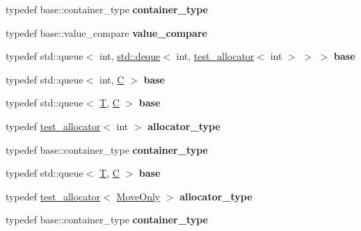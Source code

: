 \begin{DoxyCompactItemize}
\mbox{\label{structtest_a73247bd60092d6e305cfa4fe71ba65a8}} 
typedef base\+::container\+\_\+type {\bfseries container\+\_\+type}
\item 
\mbox{\label{structtest_adfa36bc6fd0cc112b780555f966052fc}} 
typedef base\+::value\+\_\+compare {\bfseries value\+\_\+compare}
\item 
\mbox{\label{structtest_ae8420c4368e1329304cace4f2f84300d}} 
typedef std\+::queue$<$ int, \mbox{\hyperlink{classstd_1_1deque}{std\+::deque}}$<$ int, \mbox{\hyperlink{classtest__allocator}{test\+\_\+allocator}}$<$ int $>$ $>$ $>$ {\bfseries base}
\item 
\mbox{\label{structtest_a2b9f414a2d11bc75fa648d1557500d0f}} 
typedef std\+::queue$<$ int, \mbox{\hyperlink{struct_c}{C}} $>$ {\bfseries base}
\item 
\mbox{\label{structtest_a9487e8c7d7e14c14936c3d5278f51354}} 
typedef std\+::queue$<$ \mbox{\hyperlink{struct_t}{T}}, \mbox{\hyperlink{struct_c}{C}} $>$ {\bfseries base}
\item 
\mbox{\label{structtest_ac503282f2bb91da46e782df80b9cef81}} 
typedef \mbox{\hyperlink{classtest__allocator}{test\+\_\+allocator}}$<$ int $>$ {\bfseries allocator\+\_\+type}
\item 
\mbox{\label{structtest_a73247bd60092d6e305cfa4fe71ba65a8}} 
typedef base\+::container\+\_\+type {\bfseries container\+\_\+type}
\item 
\mbox{\label{structtest_a9487e8c7d7e14c14936c3d5278f51354}} 
typedef std\+::queue$<$ \mbox{\hyperlink{struct_t}{T}}, \mbox{\hyperlink{struct_c}{C}} $>$ {\bfseries base}
\item 
\mbox{\label{structtest_a0daf173ec406459788a2e32d28ea6592}} 
typedef \mbox{\hyperlink{classtest__allocator}{test\+\_\+allocator}}$<$ \mbox{\hyperlink{class_move_only}{Move\+Only}} $>$ {\bfseries allocator\+\_\+type}
\item 
\mbox{\label{structtest_a73247bd60092d6e305cfa4fe71ba65a8}} 
typedef base\+::container\+\_\+type {\bfseries container\+\_\+type}

\end{DoxyCompactItemize}
